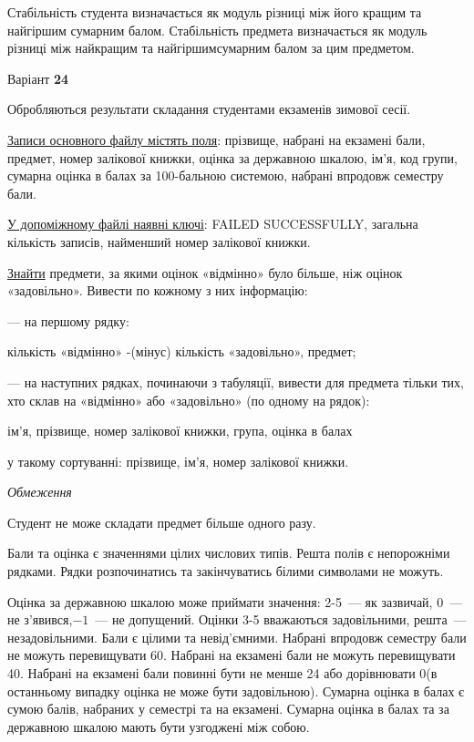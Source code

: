 \documentclass[11pt, ukrainian]{article}
\begin{document}
Стабільність студента визначається як модуль різниці між його кращим та найгіршим сумарним балом.
Стабільність предмета визначається як модуль різниці між найкращим та найгіршимсумарним балом за цим предметом.




\par
\newpage
{\center Варіант  \No \textbf { 24 }\par}
\bigskip
Обробляються результати складання студентами екзаменів зимової сесії.

\underline{Записи основного файлу містять поля}: прізвище, набрані на екзамені бали, предмет, номер залікової книжки, оцінка за державною шкалою, ім’я, код групи, сумарна оцінка в балах за 100-бальною системою, набрані впродовж семестру бали.

\underline{У допоміжному файлі наявні ключі}: FAILED SUCCESSFULLY, загальна кількість записів, найменший номер залікової книжки.

\underline{Знайти} предмети, за якими оцінок «відмінно» було більше, ніж оцінок «задовільно». Вивести по кожному з них інформацію:\par
{\noindent}--- на першому рядку:\par
кількість «відмінно» -(мінус) кількість «задовільно», предмет;

{\noindent}--- на наступних рядках, починаючи з табуляції, вивести для предмета тільки тих, хто склав на «відмінно» або «задовільно» (по одному на рядок):\par
ім’я, прізвище, номер залікової книжки, група, оцінка в балах

{\noindent}у такому сортуванні: прізвище, ім’я, номер залікової книжки.


\bigskip\textit{Обмеження}

Студент не може складати предмет більше одного разу.

Бали та оцінка є значеннями цілих числових типів. Решта полів є непорожніми рядками.
Рядки розпочинатись та закінчуватись білими символами не можуть.

Оцінка за державною шкалою може приймати значення: 2-5~--- як зазвичай, 0~--- не з’явився,$-1$~--- не допущений. 
Оцінки 3-5 вважаються задовільними, решта~--- незадовільними. 
Бали є цілими та невід’ємними.
Набрані впродовж семестру бали не можуть перевищувати 60. 
Набрані на екзамені бали не можуть перевищувати 40. 
Набрані на екзамені бали повинні бути не менше 24 або дорівнювати 0(в останньому випадку оцінка не може бути задовільною). 
Сумарна оцінка в балах є сумою балів, набраних у семестрі та на екзамені.
Сумарна оцінка в балах та за державною шкалою мають бути узгоджені між собою.
\end{document}
